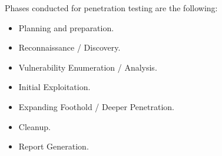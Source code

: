 Phases conducted for penetration testing are the following:

\begin{itemize}
    \item Planning and preparation.
    \item Reconnaissance / Discovery.
    \item Vulnerability Enumeration / Analysis.
    \item Initial Exploitation.
    \item Expanding Foothold / Deeper Penetration.
    \item Cleanup.
    \item Report Generation.
\end{itemize}

\clearpage
